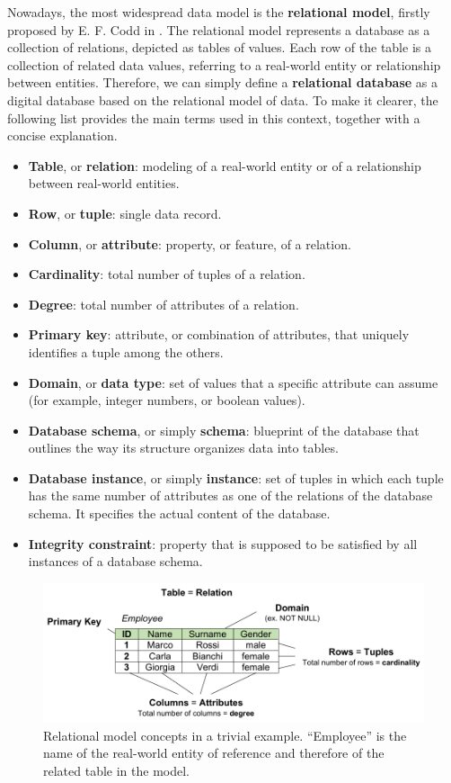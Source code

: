 Nowadays, the most widespread data model is the \textbf{relational model}, firstly proposed by E. F. Codd in \cite{codd1970relational}. The relational model represents a database as a collection of relations, depicted as tables of values. Each row of the table is a collection of related data values, referring to a real-world entity or relationship between entities. Therefore, we can simply define a \textbf{relational database} as a digital database based on the relational model of data.
To make it clearer, the following list provides the main terms used in this context, together with a concise explanation.
\begin{itemize}
\item \textbf{Table}, or \textbf{relation}: modeling of a real-world entity or of a relationship between real-world entities.
\item \textbf{Row}, or \textbf{tuple}: single data record.
\item \textbf{Column}, or \textbf{attribute}: property, or feature, of a relation.
\item \textbf{Cardinality}: total number of tuples of a relation.
\item \textbf{Degree}: total number of attributes of a relation.
\item \textbf{Primary key}: attribute, or combination of attributes, that uniquely identifies a tuple among the others.
\item \textbf{Domain}, or \textbf{data type}: set of values that a specific attribute can assume (for example, integer numbers, or boolean values).
\item \textbf{Database schema}, or simply \textbf{schema}: blueprint of the database that outlines the way its structure organizes data into tables.
\item \textbf{Database instance}, or simply \textbf{instance}: set of tuples in which each tuple has the same number of attributes as one of the relations of the database schema. It specifies the actual content of the database.
\item \textbf{Integrity constraint}: property that is supposed to be satisfied by all instances of a database schema.
\end{itemize} 

\begin{figure}[h!]
\includegraphics[scale=.75]{figures/relational_model.pdf}
\centering
\caption{Relational model concepts in a trivial example. ``Employee'' is the name of the real-world entity of reference and therefore of the related table in the model.}
\label{fig:relational_model}
\end{figure}

